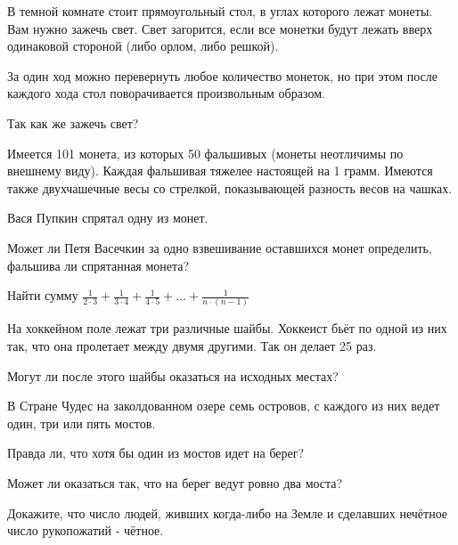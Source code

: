\begin{problem}

В темной комнате стоит прямоугольный стол, в углах которого лежат монеты. Вам нужно зажечь свет. Свет загорится, если все монетки будут лежать вверх одинаковой стороной (либо орлом, либо решкой). 

За один ход можно перевернуть любое количество монеток, но при этом после каждого хода стол поворачивается произвольным образом. 

Так как же зажечь свет?

\end{problem}
\begin{problem}

Имеется 101 монета, из которых 50 фальшивых (монеты неотличимы по внешнему виду). Каждая фальшивая тяжелее настоящей на 1 грамм. Имеются также двухчашечные весы со стрелкой, показывающей разность весов на чашках. 

Вася Пупкин спрятал одну из монет. 

Может ли Петя Васечкин за одно взвешивание оставшихся монет определить, фальшива ли спрятанная монета?

\end{problem}
\begin{problem}

Найти сумму $\frac{1}{2\cdot3} + \frac{1}{3\cdot4}+\frac{1}{4\cdot5} + \ldots + \frac{1}{n\cdot (n-1)}$

\end{problem}
\begin{problem}

На хоккейном поле лежат три различные шайбы. Хоккеист бьёт по одной из них так, что она пролетает между двумя другими. Так он делает 25 раз. 

Могут ли после этого шайбы оказаться на исходных местах?

\end{problem}
\begin{problem}

В Стране Чудес на заколдованном озере семь островов, с каждого из них ведет один, три или пять мостов. 

Правда ли, что хотя бы один из мостов идет на берег? 

Может ли оказаться так, что на берег ведут ровно два моста?

\end{problem}
\begin{problem}

Докажите, что число людей, живших когда-либо на Земле и сделавших нечётное число рукопожатий - чётное.

\end{problem}

